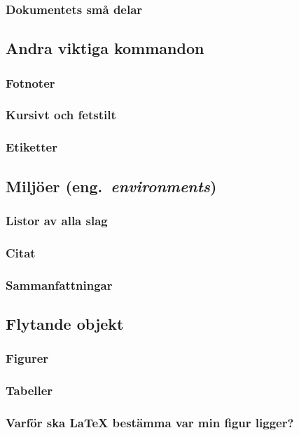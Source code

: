 \documentclass[swe,12pt]{skrapport}
\newcommand\eng[1]{(eng.~\emph{#1})}					%
\begin{document}
	\subsubsection{Dokumentets små delar}
	
	\subsection{Andra viktiga kommandon}
	\subsubsection{Fotnoter}
	\subsubsection{Kursivt och fetstilt}
	\subsubsection{Etiketter}
	
	\subsection{Miljöer \eng{environments}}
	\subsubsection{Listor av alla slag}
	\subsubsection{Citat}
	\subsubsection{Sammanfattningar}
	
	\subsection{Flytande objekt}
	\subsubsection{Figurer}
	\subsubsection{Tabeller}
	\subsubsection{Varför ska \LaTeX{} bestämma var min figur ligger?}
	
\end{document}

